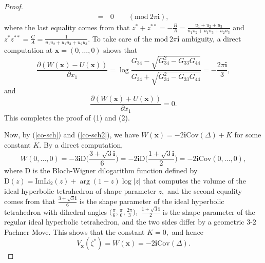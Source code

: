 \documentclass[10pt,a4paper]{amsart}
\begin{document}
\begin{proof}
\begin{equation*}
\begin{split}
=&\, 0 \quad\quad (\mathrm{mod}\ 2\pi\mathbf i),
\end{split}
\end{equation*}
where the last equality comes from that 
$z^*+z^{**}=-\frac{B}{A}=\frac{u_1+u_2+u_3}{u_1u_2+u_1u_3+u_2u_3}$ and $z^*z^{**}=\frac{C}{A}=\frac{1}{u_1u_2+u_1u_3+u_2u_3}.$ To take care of the  $\mathrm{mod}\ 2\pi\mathbf i$ ambiguity, a direct computation at $\boldsymbol x=(0,\dots,0)$ shows that 
$$\frac{\partial (W(\boldsymbol x)-U(\boldsymbol x))}{\partial x_1} =\log\frac{G_{34}-\sqrt{G_{34}^2-G_{33}G_{44}}}{G_{34}+\sqrt{G_{34}^2-G_{33}G_{44}}}=-\frac{2\pi \mathbf i}{3},$$
and 
$$\frac{\partial (W(\boldsymbol x)+U(\boldsymbol x))}{\partial x_1} = 0.$$
This completes the proof of (1) and (2).



Now, by (\ref{co-sch}) and (\ref{co-sch2}), we have $W(\boldsymbol x)=-2\mathbf i \mathrm{Cov}(\Delta)+K$ for some constant $K.$ By a direct computation, 
$$W(0,\dots,0)= -3\mathbf i\mathrm {D}\bigg(\frac{3+\sqrt{3}\mathbf i}{6}\bigg)=-2\mathbf i\mathrm D\bigg(\frac{1+\sqrt{3}\mathbf i}{2}\bigg)=-2\mathbf i\mathrm{Cov}(0,\dots,0),$$
where $\mathrm D$ is the Bloch-Wigner dilogarithm function defined by $\mathrm D(z)=\mathrm{Im}\mathrm{Li}_2(z)+\arg(1-z)\log|z|$ that computes the volume of the ideal hyperbolic tetrahedron of shape parameter $z,$ and the second equality comes from that $\frac{3+\sqrt{3}\mathbf i}{6}$ is the shape parameter of the ideal hyperbolic tetrahedron with dihedral angles $\big(\frac{\pi}{6},\frac{\pi}{6},\frac{2\pi}{3}\big),$ $\frac{1+\sqrt{3}\mathbf i}{2}$ is the shape parameter of the regular ideal hyperbolic tetrahedron, and the two sides differ by a geometric $3$-$2$ Pachner Move. This shows that the constant $K=0,$ and hence 
$$V_{\boldsymbol x}(\zeta^*)=W(\boldsymbol x)=-2\mathbf i \mathrm{Cov}(\Delta).$$   
\end{proof}
\end{document}
